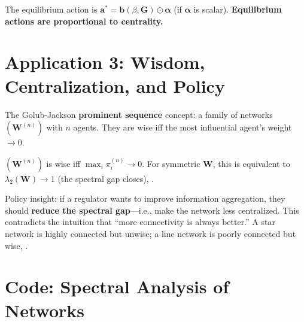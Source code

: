 The equilibrium action is $\bm{a}^* = \bm{b}(\beta, \bm{G}) \odot \bm{\alpha}$ (if $\bm{\alpha}$ is scalar). \textbf{Equilibrium actions are proportional to centrality.}

\section{Application 3: Wisdom, Centralization, and Policy}
\label{sec:spec:policy}

The Golub-Jackson \textbf{prominent sequence} concept: a family of networks $(\bm{W}^{(n)})$ with $n$ agents. They are wise iff the most influential agent's weight $\to 0$.

\begin{theorem}
$(\bm{W}^{(n)})$ is wise iff $\max_i \pi_i^{(n)} \to 0$. For symmetric $\bm{W}$, this is equivalent to $\lambda_2(\bm{W}) \to 1$ (the spectral gap closes), \cite{golub2026spectral}.
\end{theorem}

Policy insight: if a regulator wants to improve information aggregation, they should \textbf{reduce the spectral gap}---i.e., make the network less centralized. This contradicts the intuition that ``more connectivity is always better.'' A star network is highly connected but unwise; a line network is poorly connected but wise, \cite{golub2026spectral}.

\section{Code: Spectral Analysis of Networks}
\label{sec:spec:code}


